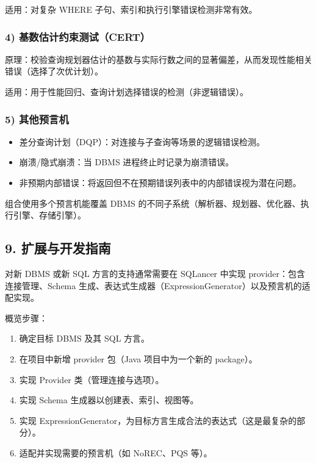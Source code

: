 \documentclass[
]{article}
\providecommand{\tightlist}{%
  \setlength{\itemsep}{0pt}\setlength{\parskip}{0pt}}
\begin{document}
适用：对复杂 WHERE 子句、索引和执行引擎错误检测非常有效。

\subsubsection{4)
基数估计约束测试（CERT）}\label{ux57faux6570ux4f30ux8ba1ux7ea6ux675fux6d4bux8bd5cert}

原理：校验查询规划器估计的基数与实际行数之间的显著偏差，从而发现性能相关错误（选择了次优计划）。

适用：用于性能回归、查询计划选择错误的检测（非逻辑错误）。

\subsubsection{5) 其他预言机}\label{ux5176ux4ed6ux9884ux8a00ux673a}

\begin{itemize}
\tightlist
\item
  差分查询计划（DQP）：对连接与子查询等场景的逻辑错误检测。\\
\item
  崩溃/隐式崩溃：当 DBMS 进程终止时记录为崩溃错误。\\
\item
  非预期内部错误：将返回但不在预期错误列表中的内部错误视为潜在问题。
\end{itemize}

组合使用多个预言机能覆盖 DBMS
的不同子系统（解析器、规划器、优化器、执行引擎、存储引擎）。

\subsection{9.
扩展与开发指南}\label{ux6269ux5c55ux4e0eux5f00ux53d1ux6307ux5357}

对新 DBMS 或新 SQL 方言的支持通常需要在 SQLancer 中实现
provider：包含连接管理、Schema
生成、表达式生成器（ExpressionGenerator）以及预言机的适配实现。

概览步骤：

\begin{enumerate}
\def\labelenumi{\arabic{enumi}.}
\tightlist
\item
  确定目标 DBMS 及其 SQL 方言。
\item
  在项目中新增 provider 包（Java 项目中为一个新的 package）。
\item
  实现 Provider 类（管理连接与选项）。
\item
  实现 Schema 生成器以创建表、索引、视图等。\\
\item
  实现
  ExpressionGenerator，为目标方言生成合法的表达式（这是最复杂的部分）。
\item
  适配并实现需要的预言机（如 NoREC、PQS 等）。
\end{enumerate}
\end{document}
